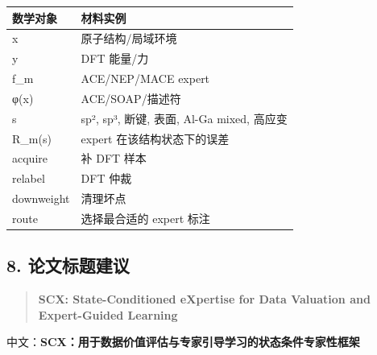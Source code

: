 \documentclass[
  12pt,
]{ctexart}
\begin{document}
\begin{longtable}[]{@{}ll@{}}
\toprule\noalign{}
数学对象 & 材料实例 \\
\midrule\noalign{}
\endhead
\bottomrule\noalign{}
\endlastfoot
x & 原子结构/局域环境 \\
y & DFT 能量/力 \\
f\_m & ACE/NEP/MACE expert \\
φ(x) & ACE/SOAP/描述符 \\
s & sp², sp³, 断键, 表面, Al-Ga mixed, 高应变 \\
R\_m(s) & expert 在该结构状态下的误差 \\
acquire & 补 DFT 样本 \\
relabel & DFT 仲裁 \\
downweight & 清理坏点 \\
route & 选择最合适的 expert 标注 \\
\end{longtable}

\subsection{8. 论文标题建议}\label{ux8bbaux6587ux6807ux9898ux5efaux8bae}

\begin{quote}
\textbf{SCX: State-Conditioned eXpertise for Data Valuation and
Expert-Guided Learning}
\end{quote}

中文：\textbf{SCX：用于数据价值评估与专家引导学习的状态条件专家性框架}
\end{document}
